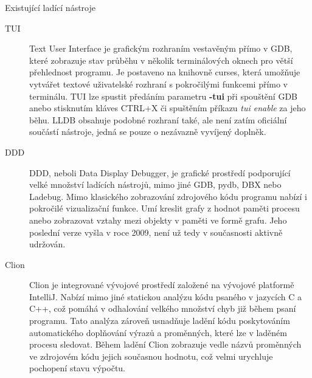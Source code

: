 \documentclass[bc,male,python,dept460]{diploma}						%
\begin{document}
\begin{section}{Existující ladící nástroje}
		\begin{description}
			\item[TUI]
				Text User Interface je grafickým rozhraním vestavěným přímo v GDB, které zobrazuje stav průběhu v několik terminálových oknech pro větší přehlednost
				programu. Je postaveno na knihovně curses, která umožňuje vytvářet textové uživatelské rozhraní s pokročilými funkcemi přímo v terminálu. TUI lze
				spustit předáním parametru \textbf{-tui} při spouštění GDB anebo stisknutím kláves CTRL+X či spuštěním příkazu \emph{tui enable} za jeho běhu.
				LLDB obsahuje podobné rozhraní také, ale není zatím oficiální součástí nástroje, jedná se pouze o nezávazně vyvíjený doplněk.
			\item[DDD]
				DDD, neboli Data Display Debugger, je grafické prostředí podporující velké množství ladících nástrojů, mimo jiné GDB, pydb, DBX nebo Ladebug.
				Mimo klasického zobrazování zdrojového kódu programu nabízí i pokročilé vizualizační funkce. Umí kreslit grafy z hodnot paměti procesu
				anebo zobrazovat vztahy mezi objekty v paměti ve formě grafu. Jeho poslední verze vyšla v roce 2009, není už tedy v současnosti aktivně udržován.		
			\item[Clion]
				Clion je integrované vývojové prostředí založené na vývojové platformě IntelliJ. Nabízí mimo jiné statickou analýzu kódu psaného v jazycích
				C a C++, což pomáhá v odhalování velkého množství chyb již během psaní programu. Tato analýza zároveň usnadňuje ladění kódu poskytováním
				automatického doplňování výrazů a proměnných, které lze v laděném procesu sledovat. Během ladění Clion zobrazuje vedle názvů proměnných
				ve zdrojovém kódu jejich současnou hodnotu, což velmi urychluje pochopení stavu výpočtu.
		\end{description}

\end{section}
\end{document}
